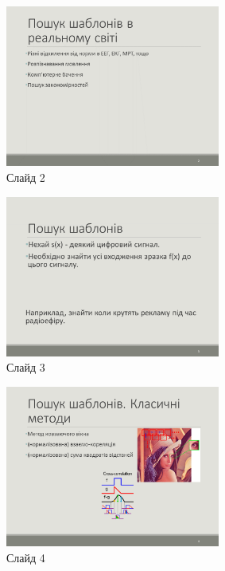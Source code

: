 \documentclass{thesis_utf8}
\begin{document}
\begin{figure}[h]
    \centering
    \includegraphics[width=0.63\textwidth]{slides/slide02.png}
    \caption{Слайд 2}
\end{figure}

\begin{figure}[h]
    \centering
    \includegraphics[width=0.63\textwidth]{slides/slide03.png}
    \caption{Слайд 3}
\end{figure}

\begin{figure}[h]
    \centering
    \includegraphics[width=0.63\textwidth]{slides/slide04.png}
    \caption{Слайд 4}
\end{figure}
\end{document}
